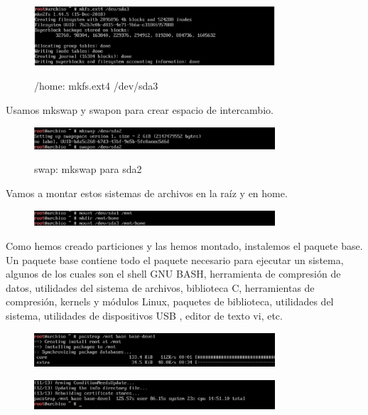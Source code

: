 \documentclass[11pt,letterpaper]{article}
\begin{document}
\begin{figure}[H]
        \centering
        \includegraphics[width=0.8\textwidth]{img/8.png}
        \label{img:Imagen 4}
        \caption{/home: mkfs.ext4 /dev/sda3}
\end{figure} 
Usamos mkswap y swapon para crear espacio de intercambio.
\begin{figure}[H]
        \centering
        \includegraphics[width=0.8\textwidth]{img/9.png}
        \label{img:Imagen 4}
        \caption{swap: mkswap para sda2}
\end{figure}
Vamos a montar estos sistemas de archivos en la raíz y en home.
\begin{figure}[H]
        \centering
        \includegraphics[width=0.8\textwidth]{img/10.png}
        \label{img:Imagen 4}
\end{figure}

Como hemos creado particiones y las hemos montado, instalemos el paquete base. Un paquete base contiene todo el paquete necesario para ejecutar un sistema, algunos de los cuales son el shell GNU BASH, herramienta de compresión de datos, utilidades del sistema de archivos, biblioteca C, herramientas de compresión, kernels y módulos Linux, paquetes de biblioteca, utilidades del sistema, utilidades de dispositivos USB , editor de texto vi, etc.
\begin{figure}[H]
        \centering
        \includegraphics[width=0.8\textwidth]{img/11.png}
        \label{img:Imagen 4}
\end{figure}
\begin{figure}[H]
        \centering
        \includegraphics[width=0.8\textwidth]{img/12.png}
        \label{img:Imagen 4}
\end{figure}
\end{document}
